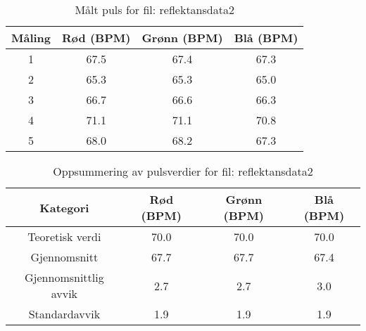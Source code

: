 
\begin{table}[H]
\centering
\caption{Målt puls for fil: reflektansdata2}
\label{tab:reflektansdata2}
\begin{tabular}{|c|c|c|c|}
\hline
\textbf{Måling} & \textbf{Rød (BPM)} & \textbf{Grønn (BPM)} & \textbf{Blå (BPM)} \\ \hline
1 & 67.5 & 67.4 & 67.3 \\ \hline
2 & 65.3 & 65.3 & 65.0 \\ \hline
3 & 66.7 & 66.6 & 66.3 \\ \hline
4 & 71.1 & 71.1 & 70.8 \\ \hline
5 & 68.0 & 68.2 & 67.3 \\ \hline
\end{tabular}
\end{table}

\begin{table}[H]
\centering
\caption{Oppsummering av pulsverdier for fil: reflektansdata2}
\label{tab:reflektansdata2_summary}
\begin{tabular}{|c|c|c|c|}
\hline
\textbf{Kategori} & \textbf{Rød (BPM)} & \textbf{Grønn (BPM)} & \textbf{Blå (BPM)} \\ \hline
Teoretisk verdi & 70.0 & 70.0 & 70.0 \\ \hline
Gjennomsnitt & 67.7 & 67.7 & 67.4 \\ \hline
Gjennomsnittlig avvik & 2.7 & 2.7 & 3.0 \\ \hline
Standardavvik & 1.9 & 1.9 & 1.9 \\ \hline
\end{tabular}
\end{table}